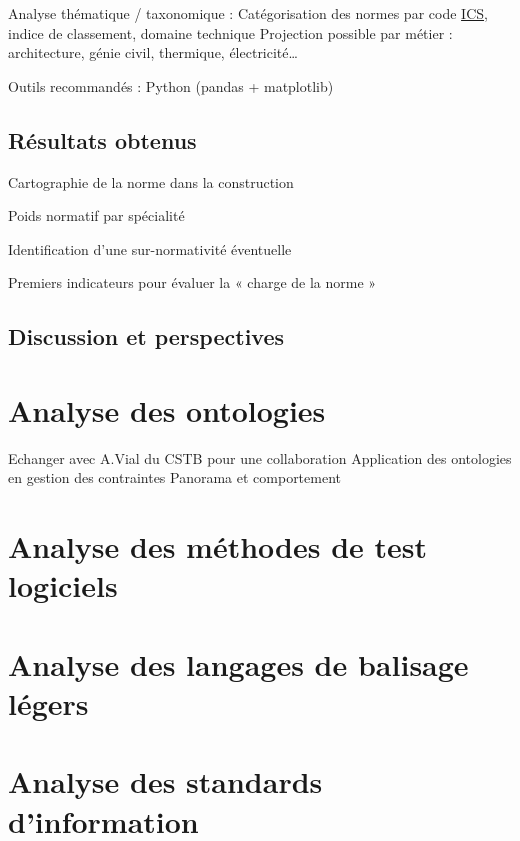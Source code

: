 \documentclass[a4paper,12pt]{article}
\begin{document}
Analyse thématique / taxonomique :
    Catégorisation des normes par code \protect\hyperlink{gls-5}{\label{gls-5-use-3}ICS}, indice de classement, domaine technique
    Projection possible par métier : architecture, génie civil, thermique, électricité…

Outils recommandés : Python (pandas + matplotlib)
\subsection{Résultats obtenus}
\label{sec:org2fde983}
Cartographie de la norme dans la construction

Poids normatif par spécialité

Identification d’une sur-normativité éventuelle

Premiers indicateurs pour évaluer la « charge de la norme »
\subsection{Discussion et perspectives}
\label{sec:orgc4eb869}
\clearpage
\section{Analyse des ontologies}
\label{sec:orgfe290ed}
Echanger avec A.Vial du CSTB pour une collaboration
Application des ontologies en gestion des contraintes
Panorama et comportement
\section{Analyse des méthodes de test logiciels}
\label{sec:org2abcaa3}
\section{Analyse des langages de balisage légers}
\label{sec:orga91e022}
\section{Analyse des standards d'information}
\label{sec:org2604a8e}
\clearpage
\end{document}
